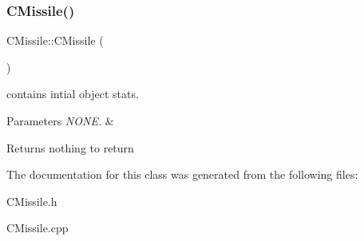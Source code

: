 \subsubsection{\texorpdfstring{C\+Missile()}{CMissile()}}
{\footnotesize\ttfamily C\+Missile\+::\+C\+Missile (\begin{DoxyParamCaption}{ }\end{DoxyParamCaption})}



contains intial object stats. 


\begin{DoxyParams}{Parameters}
{\em N\+O\+N\+E.} & \\
\hline
\end{DoxyParams}
\begin{DoxyReturn}{Returns}
nothing to return 
\end{DoxyReturn}


The documentation for this class was generated from the following files\+:\begin{DoxyCompactItemize}
\item 
C\+Missile.\+h\item 
C\+Missile.\+cpp\end{DoxyCompactItemize}

